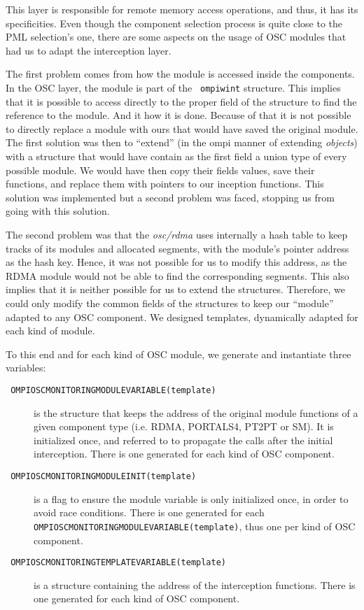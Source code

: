 This layer is responsible for remote memory access operations, and
thus, it has its specificities. Even though the component selection
process is quite close to the PML selection's one, there are some
aspects on the usage of OSC modules that had us to adapt the
interception layer.

The first problem comes from how the module is accessed inside the
components. In the OSC layer, the module is part of the {\tt
  ompi\brkunds{}win\brkunds{}t} structure. This implies that it is
possible to access directly to the proper field of the structure to
find the reference to the module. And it how it is done. Because of
that it is not possible to directly replace a module with ours that
would have saved the original module. The first solution was then to
``extend'' (in the ompi manner of extending {\it objects}) with a
structure that would have contain as the first field a union type of
every possible module. We would have then copy their fields values,
save their functions, and replace them with pointers to our inception
functions. This solution was implemented but a second problem was
faced, stopping us from going with this solution.

The second problem was that the {\it osc/rdma} uses internally a hash
table to keep tracks of its modules and allocated segments, with the
module's pointer address as the hash key. Hence, it was not possible
for us to modify this address, as the RDMA module would not be able to
find the corresponding segments. This also implies that it is neither
possible for us to extend the structures. Therefore, we could only
modify the common fields of the structures to keep our ``module''
adapted to any OSC component. We designed templates, dynamically
adapted for each kind of module.

To this end and for each kind of OSC module, we generate and
instantiate three variables:
\begin{description}
\item[{\tt
    OMPI\brkunds{}OSC\brkunds{}MONITORING\brkunds{}MODULE\brkunds{}VARIABLE(template)}]
  is the structure that keeps the address of the original module
  functions of a given component type (i.e. RDMA, PORTALS4, PT2PT or
  SM). It is initialized once, and referred to to propagate the calls
  after the initial interception. There is one generated for each kind
  of OSC component.
\item[{\tt
    OMPI\brkunds{}OSC\brkunds{}MONITORING\brkunds{}MODULE\brkunds{}INIT(template)}]
  is a flag to ensure the module variable is only initialized once, in
  order to avoid race conditions. There is one generated for each {\tt
    OMPI\brkunds{}OSC\brkunds{}MONITORING\brkunds{}MODULE\brkunds{}VARIABLE(template)},
  thus one per kind of OSC component.
\item[{\tt
    OMPI\brkunds{}OSC\brkunds{}MONITORING\brkunds{}TEMPLATE\brkunds{}VARIABLE(template)}]
  is a structure containing the address of the interception
  functions. There is one generated for each kind of OSC component.
\end{description}

